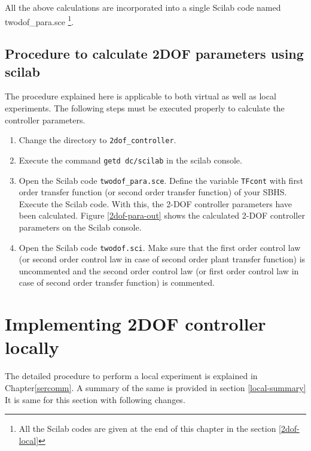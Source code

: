 All the above calculations are incorporated into a single Scilab code named {\ttfamily twodof\_para.sce} 
\footnote{All the Scilab codes are given at the end of this chapter in the section \ref{2dof-local}}.
\subsection{Procedure to calculate 2DOF parameters using scilab }\label{sec-steps}
The procedure explained here is applicable to both virtual as well as local experiments. The following steps must be executed properly to calculate the controller parameters. 
\begin{enumerate}
\item Change the directory to {\tt 2dof\_controller}. 
\item Execute the command {\tt getd dc/scilab} in the scilab console.
\item Open the Scilab code {\tt twodof\_para.sce}. Define the variable {\tt TFcont} with first order transfer function (or second order transfer function) of your SBHS. Execute the Scilab code. With this, the 2-DOF controller parameters have been calculated. Figure \ref{2dof-para-out} shows the calculated 2-DOF controller parameters on the Scilab console.
\item Open the Scilab code {\tt twodof.sci}. Make sure that the first order control law (or second order control law in case of second order plant transfer function) is uncommented and the second order control law (or first order control law in case of second order transfer function) is commented.
\end{enumerate}

\section{Implementing 2DOF controller locally}

The detailed procedure to perform a local experiment is explained in Chapter\ref{sercomm}. A summary of the same is provided in section \ref{local-summary} It is same for this section with following changes.

